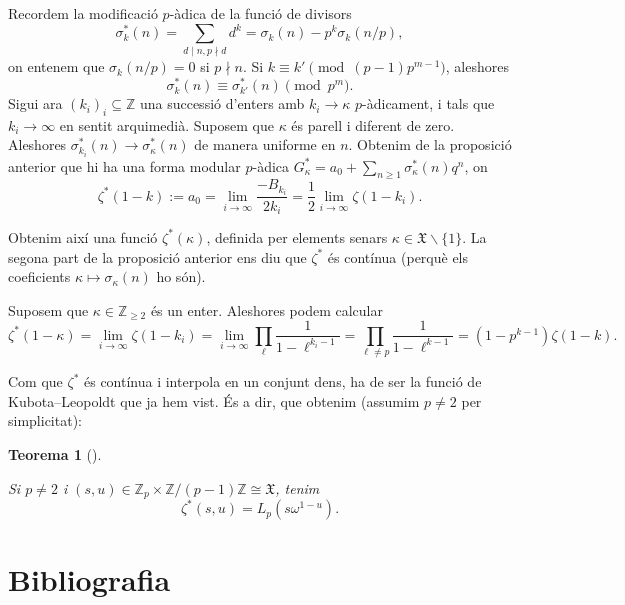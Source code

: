 \documentclass[
  letterpaper,
  DIV=11,
  numbers=noendperiod]{scrreprt}
\theoremstyle{plain}
\newtheorem{theorem}{Teorema}[chapter]
\theoremstyle{plain}
\theoremstyle{definition}
\theoremstyle{plain}
\theoremstyle{plain}
\theoremstyle{definition}
\theoremstyle{remark}
\begin{document}
Recordem la modificació \(p\)-àdica de la funció de divisors \[
\sigma_k^*(n) = \sum_{d\mid n,p\nmid d} d^k = \sigma_k(n) -p^k\sigma_k(n/p),
\] on entenem que \(\sigma_k(n/p)=0\) si \(p\nmid n\). Si
\(k\equiv k'\pmod{(p-1)p^{m-1}}\), aleshores \[
\sigma_k^*(n)\equiv \sigma_{k'}^*(n)\pmod{p^m}.
\] Sigui ara \((k_i)_i\subseteq \mathbb{Z}\) una successió d'enters amb
\(k_i\longrightarrow\kappa\) \(p\)-àdicament, i tals que
\(k_i\longrightarrow\infty\) en sentit arquimedià. Suposem que
\(\kappa\) és parell i diferent de zero. Aleshores
\(\sigma_{k_i}^*(n)\longrightarrow\sigma_{\kappa}^*(n)\) de manera
uniforme en \(n\). Obtenim de la proposició anterior que hi ha una forma
modular \(p\)-àdica
\(G_\kappa^*=a_0+\sum_{n\geq 1} \sigma_\kappa^*(n)q^n\), on \[
\zeta^*(1-k):=a_0 = \lim_{i\longrightarrow\infty} \frac{-B_{k_i}}{2k_i} = \frac{1}{2} \lim_{i\longrightarrow\infty} \zeta(1-k_i).
\]

Obtenim així una funció \(\zeta^*(\kappa)\), definida per elements
senars \(\kappa\in\mathfrak{X}\smallsetminus\{1\}\). La segona part de
la proposició anterior ens diu que \(\zeta^*\) és contínua (perquè els
coeficients \(\kappa\mapsto \sigma_{\kappa}(n)\) ho són).

Suposem que \(\kappa\in \mathbb{Z}_{\geq 2}\) és un enter. Aleshores
podem calcular \[
\zeta^*(1-\kappa) = \lim_{i\longrightarrow\infty} \zeta(1-k_i)=\lim_{i\longrightarrow\infty} \prod_\ell \frac{1}{1-\ell^{k_i-1}} = \prod_{\ell\neq p} \frac{1}{1-\ell^{k-1}} = (1-p^{k-1}) \zeta(1-k).
\]

Com que \(\zeta^*\) és contínua i interpola en un conjunt dens, ha de
ser la funció de Kubota--Leopoldt que ja hem vist. És a dir, que obtenim
(assumim \(p\neq 2\) per simplicitat):

\begin{theorem}[]\protect\hypertarget{thm-}{}\label{thm-}

Si \(p\neq 2\) i
\((s,u)\in\mathbb{Z}_p\times \mathbb{Z}/(p-1)\mathbb{Z}\cong\mathfrak{X}\),
tenim \[
\zeta^*(s,u)=L_p(s\omega^{1-u}).
\]

\end{theorem}


\chapter*{Bibliografia}\label{bibliografia}


\printbibliography[heading=none]
\end{document}
